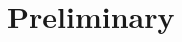 \documentclass{article} %
\theoremstyle{definition}
\theoremstyle{remark}
\begin{document}
\section{Preliminary}


\end{document}
